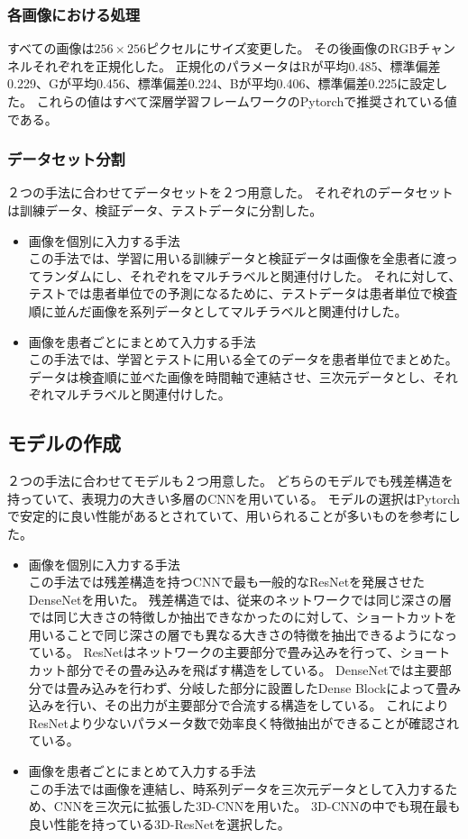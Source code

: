 \subsubsection{各画像における処理}
すべての画像は$256 \times 256$ピクセルにサイズ変更した。
その後画像のRGBチャンネルそれぞれを正規化した。
正規化のパラメータはRが平均0.485、標準偏差0.229、Gが平均0.456、標準偏差0.224、Bが平均0.406、標準偏差0.225に設定した。
これらの値はすべて深層学習フレームワークのPytorch\cite{Pytorch}で推奨されている値である。
\subsubsection{データセット分割}
２つの手法に合わせてデータセットを２つ用意した。
それぞれのデータセットは訓練データ、検証データ、テストデータに分割した。
\begin{itemize}
    \item 画像を個別に入力する手法\\
この手法では、学習に用いる訓練データと検証データは画像を全患者に渡ってランダムにし、それぞれをマルチラベルと関連付けした。
それに対して、テストでは患者単位での予測になるために、テストデータは患者単位で検査順に並んだ画像を系列データとしてマルチラベルと関連付けした。
    \item 画像を患者ごとにまとめて入力する手法\\
この手法では、学習とテストに用いる全てのデータを患者単位でまとめた。
データは検査順に並べた画像を時間軸で連結させ、三次元データとし、それぞれマルチラベルと関連付けした。
\end{itemize}

\subsection{モデルの作成}
２つの手法に合わせてモデルも２つ用意した。
どちらのモデルでも残差構造を持っていて、表現力の大きい多層のCNNを用いている。
モデルの選択はPytorchで安定的に良い性能があるとされていて、用いられることが多いものを参考にした。
\begin{itemize}
    \item 画像を個別に入力する手法\\
この手法では残差構造を持つCNN\cite{CNN}で最も一般的なResNet\cite{ResNet}を発展させたDenseNet\cite{DenseNet}を用いた。
残差構造では、従来のネットワークでは同じ深さの層では同じ大きさの特徴しか抽出できなかったのに対して、ショートカットを用いることで同じ深さの層でも異なる大きさの特徴を抽出できるようになっている。
ResNet\cite{ResNet}はネットワークの主要部分で畳み込みを行って、ショートカット部分でその畳み込みを飛ばす構造をしている。
DenseNet\cite{DenseNet}では主要部分では畳み込みを行わず、分岐した部分に設置したDense Blockによって畳み込みを行い、その出力が主要部分で合流する構造をしている。
これによりResNet\cite{ResNet}より少ないパラメータ数で効率良く特徴抽出ができることが確認されている。
    \item 画像を患者ごとにまとめて入力する手法\\
この手法では画像を連結し、時系列データを三次元データとして入力するため、CNNを三次元に拡張した3D-CNNを用いた。
3D-CNNの中でも現在最も良い性能を持っている3D-ResNet\cite{3D_ResNet}を選択した。
\end{itemize}

